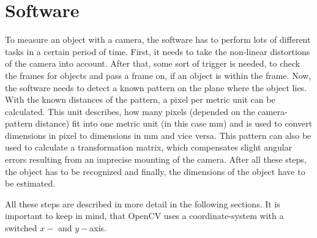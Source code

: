 \clearpage
\section{Software}
To measure an object with a camera, the software has to perform lots of different tasks in a certain period of time.
First, it needs to take the non-linear distortions of the camera into account.
After that, some sort of trigger is needed, to check the frames for objects and pass a frame on, if an object is within the frame.
Now, the software needs to detect a known pattern on the plane where the object lies.
With the known distances of the pattern, a pixel per metric unit can be calculated.
This unit describes, how many pixels (depended on the camera-pattern distance) fit into one metric unit (in this case mm) and is used to convert dimensions in pixel to dimensions in mm and vice versa.
This pattern can also be used to calculate a transformation matrix, which compensates slight angular errors resulting from an imprecise mounting of the camera.
After all these steps, the object has to be recognized and
finally, the dimensions of the object have to be estimated.

All these steps are described in more detail in the following sections.
It is important to keep in mind, that OpenCV uses a coordinate-system with a switched $x-$ and $y-$axis. 


\lstset{style=mystyle}

